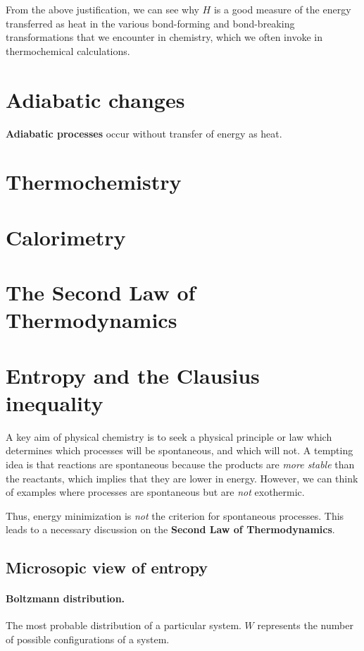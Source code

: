 \documentclass{article}
\numberwithin{theorem}{section}
\numberwithin{corollary}{section}
\numberwithin{postulate}{section}
\numberwithin{lemma}{section}
\numberwithin{definition}{section}
\begin{document}
From the above justification, we can see why $H$ is a good measure of the energy transferred as heat in the various bond-forming and bond-breaking transformations that we encounter in chemistry, which we often invoke in thermochemical calculations.

\section{Adiabatic changes}

\textbf{Adiabatic processes} occur without transfer of energy as heat.

\section{Thermochemistry}

\section{Calorimetry}

\section{The Second Law of Thermodynamics}

\pagebreak

\section{Entropy and the Clausius inequality}

A key aim of physical chemistry is to seek a physical principle or law which
determines which processes will be spontaneous, and which will not. A tempting
idea is that reactions are spontaneous because the products are \textit{more
stable} than the reactants, which implies that they are lower in energy.
However, we can think of examples where processes are spontaneous but are
\textit{not} exothermic. 

Thus, energy minimization is \textit{not} the criterion for spontaneous
processes. This leads to a necessary discussion on the \textbf{Second Law of
Thermodynamics}.

\subsection{Microsopic view of entropy}

\paragraph{Boltzmann distribution. } The most probable distribution of a
particular system. $W$ represents the number of possible configurations of a
system.
\end{document}
